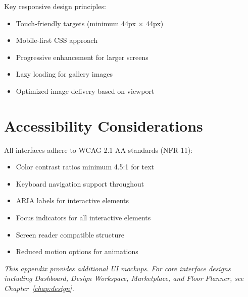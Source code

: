 Key responsive design principles:
\begin{itemize}
    \item Touch-friendly targets (minimum 44px × 44px)
    \item Mobile-first CSS approach
    \item Progressive enhancement for larger screens
    \item Lazy loading for gallery images
    \item Optimized image delivery based on viewport
\end{itemize}

\section{Accessibility Considerations}
\label{sec:app_ui_a11y}

All interfaces adhere to WCAG 2.1 AA standards (NFR-11):

\begin{itemize}
    \item Color contrast ratios minimum 4.5:1 for text
    \item Keyboard navigation support throughout
    \item ARIA labels for interactive elements
    \item Focus indicators for all interactive elements
    \item Screen reader compatible structure
    \item Reduced motion options for animations
\end{itemize}

\vspace{1cm}
\textit{This appendix provides additional UI mockups. For core interface designs including Dashboard, Design Workspace, Marketplace, and Floor Planner, see Chapter~\ref{chap:design}.}

